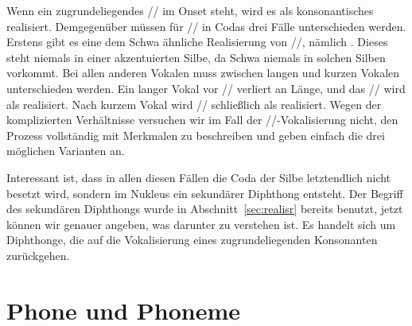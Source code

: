 \begin{exe}
  \ex\label{ex:phol9906}
  \begin{xlist}
  \end{xlist}
\end{exe}

Wenn ein zugrundeliegendes // im Onset steht, wird es als konsonantisches \textipa{[K]} realisiert.
Demgegenüber müssen für // in Codas drei Fälle unterschieden werden.
Erstens gibt es eine dem Schwa ähnliche Realisierung von //, nämlich \textipa{[5]}.
Dieses steht niemals in einer akzentuierten Silbe, da Schwa niemals in solchen Silben vorkommt.
Bei allen anderen Vokalen muss zwischen langen und kurzen Vokalen unterschieden werden.
Ein langer Vokal vor // verliert an Länge, und das // wird als \textipa{[5]} realisiert.
Nach kurzem Vokal wird // schließlich als \textipa{[@]} realisiert.
Wegen der komplizierten Verhältnisse versuchen wir im Fall der //-Vokalisierung nicht, den Prozess vollständig mit Merkmalen zu beschreiben und geben einfach die drei möglichen Varianten an.


Interessant ist, dass in allen diesen Fällen die Coda der Silbe letztendlich nicht besetzt wird, sondern im Nukleus ein sekundärer Diphthong entsteht.
Der Begriff des sekundären Diphthongs wurde in Abschnitt~\ref{sec:realisr} bereits benutzt, jetzt können wir genauer angeben, was darunter zu verstehen ist.
Es handelt sich um Diphthonge, die auf die Vokalisierung eines zugrundeliegenden Konsonanten zurückgehen.

\section[Phone und Phoneme]{\Opsional Phone und Phoneme}

